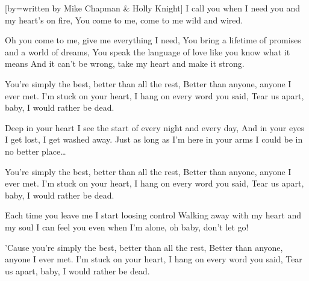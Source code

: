 [by={written by Mike Chapman \& Holly Knight}]
\beginverse
I call you when I need you and my heart's on fire,
You come to me, come to me wild and wired.
\endverse

\beginverse
Oh you come to me, give me everything I need,
You bring a lifetime of promises and a world of dreams,
You speak the language of love like you know what it means
And it can't be wrong, take my heart and make it strong.
\endverse 

\beginchorus
You're simply the best, better than all the rest,
Better than anyone, anyone I ever met.
I'm stuck on your heart, I hang on every word you said,
Tear us apart, baby, I would rather be dead.
\endchorus

\beginverse 
Deep in your heart I see the start of every night and every day,
And in your eyes I get lost, I get washed away.
Just as long as I'm here in your arms I could be in no better place\dots
\endverse

\beginchorus
You're simply the best, better than all the rest,
Better than anyone, anyone I ever met.
I'm stuck on your heart, I hang on every word you said,
Tear us apart, baby, I would rather be dead.
\endchorus
 
\beginverse
Each time you leave me I start loosing control
Walking away with my heart and my soul
I can feel you even when I'm alone, oh baby, don't let go!
\endverse

\beginverse 
'Cause you're simply the best, better than all the rest,
Better than anyone, anyone I ever met.
I'm stuck on your heart, I hang on every word you said,
Tear us apart, baby, I would rather be dead.
\endverse
\endsong
